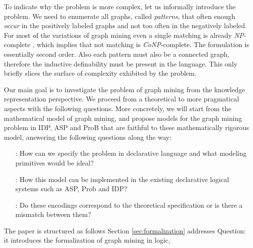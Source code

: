 To indicate why the problem is more complex, let us informally introduce the problem. We need to enumerate all graphs, called \textit{patterns}, that often enough \textit{occur} in the positively labeled graphs and not too often in the negatively labeled. For most of the variations of graph mining even a single matching is already \textit{NP}-complete \citep{subtree_overview}, which implies that not matching is \textit{CoNP}-complete. The formulation is essentially second order. Also each pattern must also be a connected graph, therefore the inductive definability must be present in the language.  This only briefly slices the surface of complexity exhibited by the problem.

Our main goal is to investigate the problem of graph mining from the knowledge representation perspective. We proceed from a theoretical to more pragmatical aspects with the following questions. More concretely, we will start from the mathematical model of graph mining, and propose models for the graph mining problem in IDP, ASP and ProB that are faithful to these mathematically rigorous model,
answering the following questions along the way:
\begin{itemize}
  \item[\Qone:]  How can we specify the problem in declarative language and what modeling primitives would be ideal?
  \item[\Qtwo:]  How this model can be implemented in the existing declarative logical systems such as ASP, Prob and IDP?
  \item[\Qthree:] Do these encodings correspond to the theoretical specification or is there a mismatch between them?
\end{itemize}

The paper is structured as follows Section \ref{sec:formalization} addresses Question: it introduces the formalization of graph mining in logic, 
